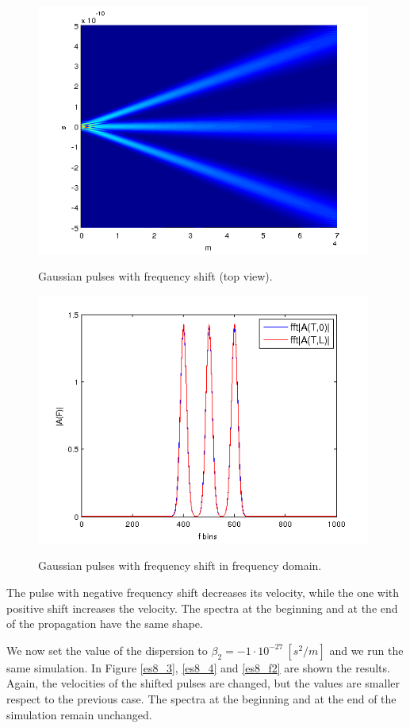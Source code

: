 \documentclass[a4paper,10pt]{report}
\begin{document}
\begin{figure}[!ht]
  \centering
  \includegraphics[width=11cm]{es8_2.png}\\
  \caption{Gaussian pulses with frequency shift (top view).}
  \label{es8_2}
\end{figure}

\begin{figure}[!ht]
  \centering
  \includegraphics[width=11cm]{es8_f1.png}\\
  \caption{Gaussian pulses with frequency shift in frequency domain.}
  \label{es8_f1}
\end{figure}


The pulse with negative frequency shift decreases its velocity, while the one with positive shift increases the velocity.
The spectra at the beginning and at the end of the propagation have the same shape.

We now set the value of the dispersion to $\beta_2 = -1 \cdot 10^{-27} \ [s^2/m]$ and we run the same simulation.
In Figure \ref{es8_3}, \ref{es8_4} and \ref{es8_f2} are shown the results.
Again, the velocities of the shifted pulses are changed, but the values are smaller respect to the previous case.
The spectra at the beginning and at the end of the simulation remain unchanged.
\end{document}
